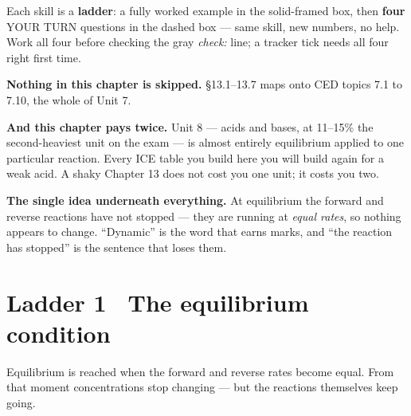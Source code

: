 \documentclass{apchem-worksheet}
\begin{document}
\apctitleblock

\begin{apcnote}
Each skill is a \textbf{ladder}: a fully worked example in the
solid-framed box, then \textbf{four} YOUR TURN questions in the dashed
box --- same skill, new numbers, no help. Work all four before checking
the gray \emph{check:} line; a tracker tick needs all four right first
time.

\textbf{Nothing in this chapter is skipped.} \S13.1--13.7 maps onto CED
topics 7.1 to 7.10, the whole of Unit 7.

\textbf{And this chapter pays twice.} Unit 8 --- acids and bases, at
11--15\% the second-heaviest unit on the exam --- is almost entirely
equilibrium applied to one particular reaction. Every ICE table you
build here you will build again for a weak acid. A shaky Chapter 13
does not cost you one unit; it costs you two.

\textbf{The single idea underneath everything.} At equilibrium the
forward and reverse reactions have not stopped --- they are running at
\emph{equal rates}, so nothing appears to change. ``Dynamic'' is the
word that earns marks, and ``the reaction has stopped'' is the sentence
that loses them.
\end{apcnote}

\section*{\sffamily Ladder 1 \textbullet\ The equilibrium condition}

Equilibrium is reached when the forward and reverse rates become equal.
From that moment concentrations stop changing --- but the reactions
themselves keep going.
\end{document}

